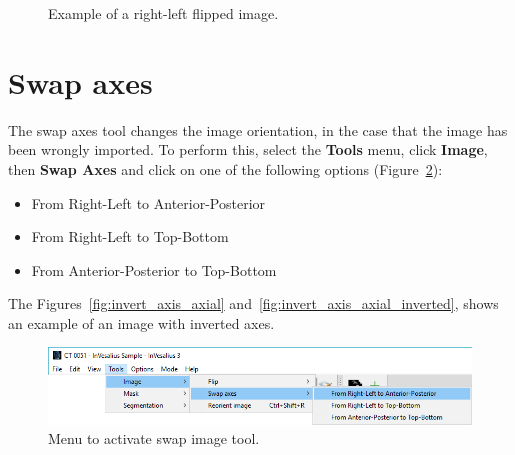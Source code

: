 \begin{figure}[!htb]
  \centering
    \qquad
  \hfill
  \caption{Example of a right-left flipped image.}
  \label{fig:mirrored}
\end{figure}

\section{Swap axes}

The swap axes tool changes the image orientation, in the case that the image has been wrongly imported. To perform this, select the \textbf{Tools} menu, click \textbf{Image}, then \textbf{Swap Axes} and click on one of the following options (Figure~\ref{fig:menu_invert_axis}):

\begin{itemize}
	\item From Right-Left to Anterior-Posterior
	\item From Right-Left to Top-Bottom
	\item From Anterior-Posterior to Top-Bottom
\end{itemize}


The Figures~\ref{fig:invert_axis_axial} and~\ref{fig:invert_axis_axial_inverted}, shows an example of an image with inverted axes.

\begin{figure}[!htb]
\centering
\includegraphics[scale=0.4]{../user_guide_figures/invesalius_screen/menu_invert_axis_en.png}
\caption{Menu to activate swap image tool.}
\label{fig:menu_invert_axis}
\end{figure}

